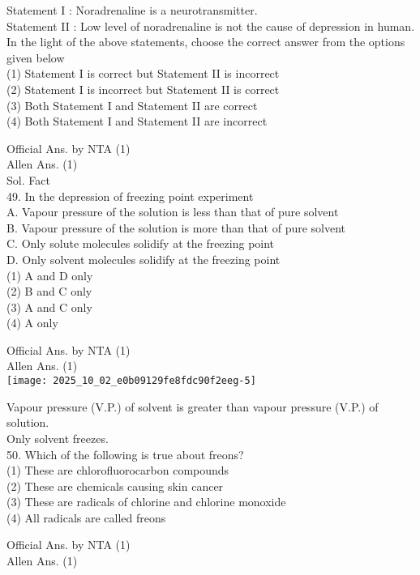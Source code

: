 \documentclass[10pt]{article}
\begin{document}
Statement I : Noradrenaline is a neurotransmitter.\\
Statement II : Low level of noradrenaline is not the cause of depression in human.\\
In the light of the above statements, choose the correct answer from the options given below\\
(1) Statement I is correct but Statement II is incorrect\\
(2) Statement I is incorrect but Statement II is correct\\
(3) Both Statement I and Statement II are correct\\
(4) Both Statement I and Statement II are incorrect

Official Ans. by NTA (1)\\
Allen Ans. (1)\\
Sol. Fact\\
49. In the depression of freezing point experiment\\
A. Vapour pressure of the solution is less than that of pure solvent\\
B. Vapour pressure of the solution is more than that of pure solvent\\
C. Only solute molecules solidify at the freezing point\\
D. Only solvent molecules solidify at the freezing point\\
(1) A and D only\\
(2) B and C only\\
(3) A and C only\\
(4) A only

Official Ans. by NTA (1)\\
Allen Ans. (1)\\
\texttt{[image: 2025\_10\_02\_e0b09129fe8fdc90f2eeg-5]}

Vapour pressure (V.P.) of solvent is greater than vapour pressure (V.P.) of solution.\\
Only solvent freezes.\\
50. Which of the following is true about freons?\\
(1) These are chlorofluorocarbon compounds\\
(2) These are chemicals causing skin cancer\\
(3) These are radicals of chlorine and chlorine monoxide\\
(4) All radicals are called freons

Official Ans. by NTA (1)\\
Allen Ans. (1)
\end{document}
